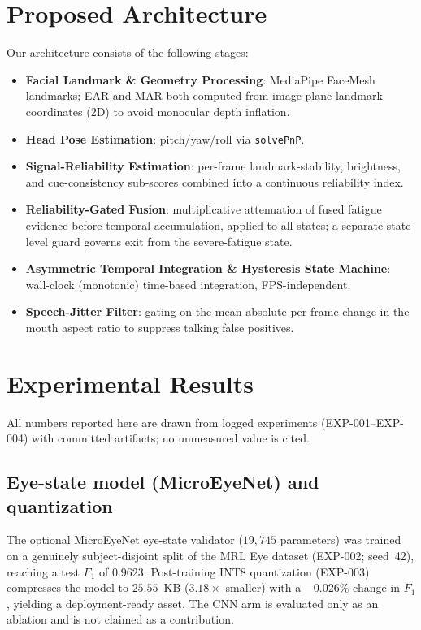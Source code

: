 \documentclass[10pt,conference]{IEEEtran}
\begin{document}
\section{Proposed Architecture}
Our architecture consists of the following stages:
\begin{itemize}
    \item \textbf{Facial Landmark \& Geometry Processing}: MediaPipe FaceMesh landmarks; EAR and MAR both computed from image-plane landmark coordinates (2D) to avoid monocular depth inflation.
    \item \textbf{Head Pose Estimation}: pitch/yaw/roll via \texttt{solvePnP}.
    \item \textbf{Signal-Reliability Estimation}: per-frame landmark-stability, brightness, and cue-consistency sub-scores combined into a continuous reliability index.
    \item \textbf{Reliability-Gated Fusion}: multiplicative attenuation of fused fatigue evidence before temporal accumulation, applied to all states; a separate state-level guard governs exit from the severe-fatigue state.
    \item \textbf{Asymmetric Temporal Integration \& Hysteresis State Machine}: wall-clock (monotonic) time-based integration, FPS-independent.
    \item \textbf{Speech-Jitter Filter}: gating on the mean absolute per-frame change in the mouth aspect ratio to suppress talking false positives.
\end{itemize}

\section{Experimental Results}
All numbers reported here are drawn from logged experiments
(\mbox{EXP-001}--\mbox{EXP-004}) with committed artifacts; no unmeasured value
is cited.

\subsection{Eye-state model (MicroEyeNet) and quantization}
The optional MicroEyeNet eye-state validator ($19{,}745$ parameters) was trained
on a genuinely subject-disjoint split of the MRL Eye dataset (\mbox{EXP-002};
seed~42), reaching a test $F_1$ of $0.9623$. Post-training INT8 quantization
(\mbox{EXP-003}) compresses the model to $25.55$~KB ($3.18\times$ smaller) with a
$-0.026\%$ change in $F_1$, yielding a deployment-ready asset. The CNN arm is
evaluated only as an ablation and is not claimed as a contribution.
\end{document}
